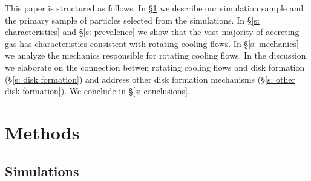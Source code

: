 \documentclass[fleqn,usenatbib]{mnras}
\begin{document}
This paper is structured as follows. 
In \S\ref{s: methods} we describe our simulation sample and the primary sample of particles selected from the simulations.
In \S\ref{s: characteristics} and \S\ref{s: prevalence} we show that the vast majority of accreting gas has characteristics consistent with rotating cooling flows.
In \S\ref{s: mechanics} we analyze the mechanics responsible for rotating cooling flows.
In the discussion we elaborate on the connection betwen rotating cooling flows and disk formation (\S\ref{s: disk formation}) and address other disk formation mechanisms (\S\ref{s: other disk formation}).
We conclude in \S\ref{s: conclusions}.

\section{Methods}
\label{s: methods}

\subsection{Simulations}
\label{s: methods -- simulations}
\end{document}
